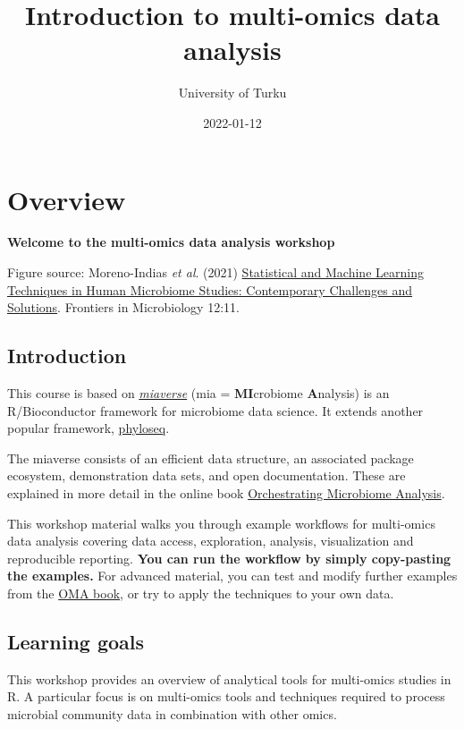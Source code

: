 \documentclass[
  oneside]{book}
\title{Introduction to multi-omics data analysis}
\author{University of Turku}
\date{2022-01-12}
\begin{document}
\maketitle

{
\setcounter{tocdepth}{1}
\tableofcontents
}
\hypertarget{overview}{%
\chapter{Overview}\label{overview}}

\textbf{Welcome to the multi-omics data analysis workshop}

Figure source: Moreno-Indias \emph{et al}. (2021) \href{https://doi.org/10.3389/fmicb.2021.635781}{Statistical and Machine Learning Techniques in Human Microbiome Studies: Contemporary Challenges and Solutions}. Frontiers in Microbiology 12:11.

\hypertarget{introduction}{%
\section{Introduction}\label{introduction}}

This course is based on \href{https://microbiome.github.io}{\emph{miaverse}} (mia = \textbf{MI}crobiome \textbf{A}nalysis) is an
R/Bioconductor framework for microbiome data science. It extends another popular framework, \href{https://joey711.github.io/phyloseq/}{phyloseq}.

The miaverse consists of an efficient data structure, an
associated package ecosystem, demonstration data sets, and open
documentation. These are explained in more detail in the online book
\href{https://microbiome.github.io/OMA}{Orchestrating Microbiome Analysis}.

This workshop material walks you through example workflows for multi-omics data
analysis covering data access, exploration, analysis, visualization and reproducible
reporting. \textbf{You can run the workflow by simply copy-pasting the
examples.} For advanced material, you can test and modify further
examples from the \href{https://microbiome.github.io/OMA}{OMA book}, or try
to apply the techniques to your own data.

\hypertarget{learning-goals}{%
\section{Learning goals}\label{learning-goals}}

This workshop provides an overview of analytical
tools for multi-omics studies in R. A particular focus is on multi-omics tools and techniques
required to process microbial community data in combination with other omics.
\end{document}
